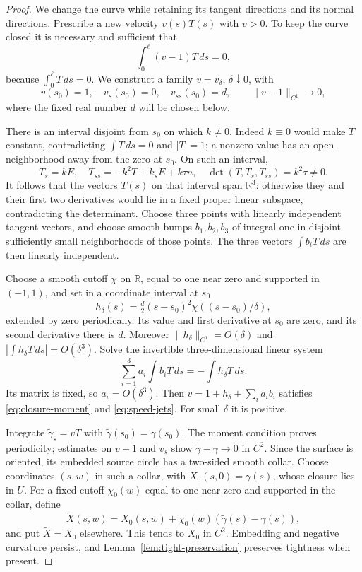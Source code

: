 \documentclass[11pt]{amsart}
\theoremstyle{definition}
\newcommand{\R}{\mathbb R}
\begin{document}
\begin{proof}
We change the curve while retaining its tangent directions
and its normal directions. Prescribe a new velocity $v(s)T(s)$
with $v>0$. To keep the curve closed it is necessary and sufficient
that
\begin{equation}\label{eq:closure-moment}
 \int_0^\ell(v-1)T\,ds=0,
\end{equation}
because $\int_0^\ell T\,ds=0$. We construct a family $v=v_\delta$,
$\delta\downarrow0$, with
\begin{equation}\label{eq:speed-jets}
 v(s_0)=1,\quad v_s(s_0)=0,\quad v_{ss}(s_0)=d,
 \qquad \|v-1\|_{C^1}\longrightarrow0,
\end{equation}
where the fixed real number $d$ will be chosen below.

There is an interval disjoint from $s_0$ on which $k\ne0$.
Indeed $k\equiv0$ would make $T$ constant, contradicting
$\int T\,ds=0$ and $|T|=1$; a nonzero value has an open
neighborhood away from the zero at $s_0$. On such an interval,
\[
 T_s=kE,\quad T_{ss}=-k^2T+k_sE+k\tau n,\quad
 \det(T,T_s,T_{ss})=k^2\tau\ne0.
\]
It follows that the vectors $T(s)$ on that interval span $\R^3$:
otherwise they and their first two derivatives would lie in a
fixed proper linear subspace, contradicting the determinant.
Choose three points with linearly independent tangent vectors,
and choose smooth bumps $b_1,b_2,b_3$ of integral one in
disjoint sufficiently small neighborhoods of those points.
The three vectors $\int b_iT\,ds$ are then linearly independent.

Choose a smooth cutoff $\chi$ on $\R$, equal to one near zero
and supported in $(-1,1)$, and set in a coordinate interval at $s_0$
\[
 h_\delta(s)=\tfrac d2(s-s_0)^2
                        \chi((s-s_0)/\delta),
\]
extended by zero periodically. Its value and first derivative at
$s_0$ are zero, and its second derivative there is $d$.
Moreover $\|h_\delta\|_{C^1}=O(\delta)$ and
$|\int h_\delta T\,ds|=O(\delta^3)$.
Solve the invertible three-dimensional linear system
\[
 \sum_{i=1}^3 a_i\int b_iT\,ds=-\int h_\delta T\,ds.
\]
Its matrix is fixed, so $a_i=O(\delta^3)$.
Then $v=1+h_\delta+\sum_i a_i b_i$ satisfies
\eqref{eq:closure-moment} and \eqref{eq:speed-jets}.
For small $\delta$ it is positive.

Integrate $\widetilde\gamma_s=vT$ with
$\widetilde\gamma(s_0)=\gamma(s_0)$. The moment condition proves
periodicity; estimates on $v-1$ and $v_s$ show
$\widetilde\gamma-\gamma\to0$ in $C^2$.
Since the surface is oriented, its embedded source circle has a
two-sided smooth collar. Choose coordinates $(s,w)$ in such a
collar, with $X_0(s,0)=\gamma(s)$, whose closure lies in $U$.
For a fixed cutoff $\chi_0(w)$ equal to one near zero and
supported in the collar, define
\[
 \widetilde X(s,w)=X_0(s,w)+
              \chi_0(w)(\widetilde\gamma(s)-\gamma(s)),
\]
and put $\widetilde X=X_0$ elsewhere.
This tends to $X_0$ in $C^2$. Embedding and negative curvature
persist, and Lemma~\ref{lem:tight-preservation} preserves
tightness when present.


\end{proof}
\end{document}
